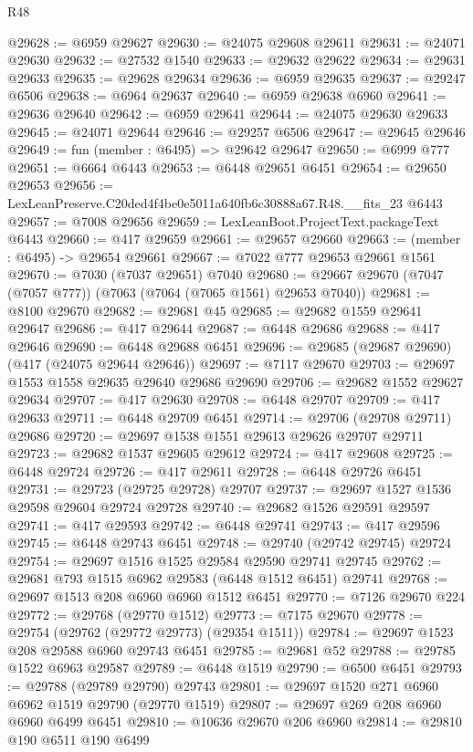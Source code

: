 \begin{lexlean}{R48}
\begin{coremodule}
@29628 := @6959 @29627
@29630 := @24075 @29608 @29611
@29631 := @24071 @29630
@29632 := @27532 @1540
@29633 := @29632 @29622
@29634 := @29631 @29633
@29635 := @29628 @29634
@29636 := @6959 @29635
@29637 := @29247 @6506
@29638 := @6964 @29637
@29640 := @6959 @29638 @6960
@29641 := @29636 @29640
@29642 := @6959 @29641
@29644 := @24075 @29630 @29633
@29645 := @24071 @29644
@29646 := @29257 @6506
@29647 := @29645 @29646
@29649 := fun (member : @6495) => @29642 @29647
@29650 := @6999 @777
@29651 := @6664 @6443
@29653 := @6448 @29651 @6451
@29654 := @29650 @29653
@29656 := LexLeanPreserve.C20ded4f4be0e5011a640fb6c30888a67.R48.__fits_23 @6443
@29657 := @7008 @29656
@29659 := LexLeanBoot.ProjectText.packageText @6443
@29660 := @417 @29659
@29661 := @29657 @29660
@29663 := (member : @6495) -> @29654 @29661
@29667 := @7022 @777 @29653 @29661 @1561
@29670 := @7030 (@7037 @29651) @7040
@29680 := @29667 @29670 (@7047 (@7057 @777)) (@7063 (@7064 (@7065 @1561) @29653 @7040))
@29681 := @8100 @29670
@29682 := @29681 @45
@29685 := @29682 @1559 @29641 @29647
@29686 := @417 @29644
@29687 := @6448 @29686
@29688 := @417 @29646
@29690 := @6448 @29688 @6451
@29696 := @29685 (@29687 @29690) (@417 (@24075 @29644 @29646))
@29697 := @7117 @29670
@29703 := @29697 @1553 @1558 @29635 @29640 @29686 @29690
@29706 := @29682 @1552 @29627 @29634
@29707 := @417 @29630
@29708 := @6448 @29707
@29709 := @417 @29633
@29711 := @6448 @29709 @6451
@29714 := @29706 (@29708 @29711) @29686
@29720 := @29697 @1538 @1551 @29613 @29626 @29707 @29711
@29723 := @29682 @1537 @29605 @29612
@29724 := @417 @29608
@29725 := @6448 @29724
@29726 := @417 @29611
@29728 := @6448 @29726 @6451
@29731 := @29723 (@29725 @29728) @29707
@29737 := @29697 @1527 @1536 @29598 @29604 @29724 @29728
@29740 := @29682 @1526 @29591 @29597
@29741 := @417 @29593
@29742 := @6448 @29741
@29743 := @417 @29596
@29745 := @6448 @29743 @6451
@29748 := @29740 (@29742 @29745) @29724
@29754 := @29697 @1516 @1525 @29584 @29590 @29741 @29745
@29762 := @29681 @793 @1515 @6962 @29583 (@6448 @1512 @6451) @29741
@29768 := @29697 @1513 @208 @6960 @6960 @1512 @6451
@29770 := @7126 @29670 @224
@29772 := @29768 (@29770 @1512)
@29773 := @7175 @29670
@29778 := @29754 (@29762 (@29772 @29773) (@29354 @1511))
@29784 := @29697 @1523 @208 @29588 @6960 @29743 @6451
@29785 := @29681 @52
@29788 := @29785 @1522 @6963 @29587
@29789 := @6448 @1519
@29790 := @6500 @6451
@29793 := @29788 (@29789 @29790) @29743
@29801 := @29697 @1520 @271 @6960 @6962 @1519 @29790 (@29770 @1519)
@29807 := @29697 @269 @208 @6960 @6960 @6499 @6451
@29810 := @10636 @29670 @206 @6960
@29814 := @29810 @190 @6511 @190 @6499

\end{coremodule}
\end{lexlean}
